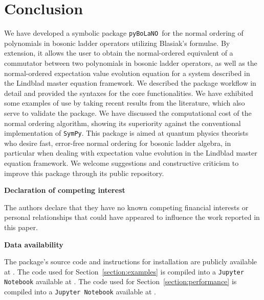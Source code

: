 \documentclass[5p, twocolumn, 10pt, sort&compress]{elsarticle}
\newcounter{bla}
\newcommand{\pybolano}{\texttt{pyBoLaNO}~}
\newenvironment{revision}{}{}
\begin{document}

\section{Conclusion}\label{section:conclusion}

We have developed a symbolic package \pybolano for the normal ordering of polynomials in bosonic ladder operators utilizing Blasiak's formulae. By extension, it allows the user to obtain the normal-ordered equivalent of a commutator between two polynomials in bosonic ladder operators, as well as the normal-ordered expectation value evolution equation for a system described in the Lindblad master equation framework. We described the package workflow in detail and provided the syntaxes for the core functionalities. We have exhibited some examples of use by taking recent results from the literature, which also serve to validate the package. We have discussed the computational cost of the normal ordering algorithm, \begin{revision}showing its superiority against the conventional implementation of \texttt{SymPy}.\end{revision} This package is aimed at quantum physics theorists who desire fast, error-free normal ordering for bosonic ladder algebra, in particular when dealing with expectation value evolution in the Lindblad master equation framework. We welcome suggestions and constructive criticism to improve this package through its public repository. 


\medskip
\noindent\textbf{Declaration of competing interest}
\medskip

The authors declare that they have no known competing financial interests or personal relationships that could have appeared to influence the work reported in this paper.

\medskip
\noindent\textbf{Data availability}
\medskip

The package's source code and instructions for installation are publicly available at \href{https://github.com/hendry24/pyBoLaNO}{}. The code used for Section~\ref{section:examples} is compiled into a \texttt{Jupyter Notebook} available at \href{https://github.com/hendry24/pyBoLaNO/blob/main/tutorial.ipynb}{}. \begin{revision}The code used for Section~\ref{section:performance} is compiled into a \texttt{Jupyter Notebook} available at \href{https://github.com/hendry24/pyBoLaNO/blob/main/benchmarks.ipynb}{}.\end{revision}
\end{document}
